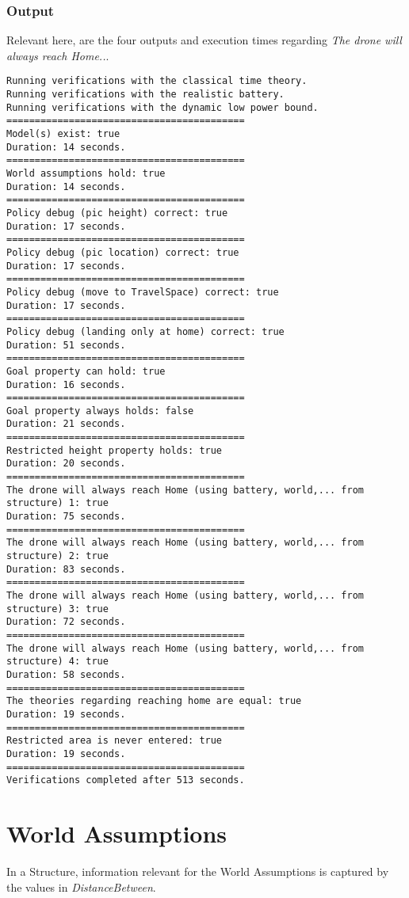 \documentclass[12pt]{extarticle}
\begin{document}
\subsubsection*{Output}
Relevant here, are the four outputs and execution times regarding \textit{The drone will always reach Home..}.
\begin{lstlisting}[basicstyle=\tiny]
Running verifications with the classical time theory.
Running verifications with the realistic battery.
Running verifications with the dynamic low power bound.
==========================================
Model(s) exist: true
Duration: 14 seconds.
==========================================
World assumptions hold: true
Duration: 14 seconds.
==========================================
Policy debug (pic height) correct: true
Duration: 17 seconds.
==========================================
Policy debug (pic location) correct: true
Duration: 17 seconds.
==========================================
Policy debug (move to TravelSpace) correct: true
Duration: 17 seconds.
==========================================
Policy debug (landing only at home) correct: true
Duration: 51 seconds.
==========================================
Goal property can hold: true
Duration: 16 seconds.
==========================================
Goal property always holds: false
Duration: 21 seconds.
==========================================
Restricted height property holds: true
Duration: 20 seconds.
==========================================
The drone will always reach Home (using battery, world,... from structure) 1: true
Duration: 75 seconds.
==========================================
The drone will always reach Home (using battery, world,... from structure) 2: true
Duration: 83 seconds.
==========================================
The drone will always reach Home (using battery, world,... from structure) 3: true
Duration: 72 seconds.
==========================================
The drone will always reach Home (using battery, world,... from structure) 4: true
Duration: 58 seconds.
==========================================
The theories regarding reaching home are equal: true
Duration: 19 seconds.
==========================================
Restricted area is never entered: true
Duration: 19 seconds.
==========================================
Verifications completed after 513 seconds.
\end{lstlisting}

\section{World Assumptions}
In a Structure, information relevant for the World Assumptions is captured by the values in \textit{DistanceBetween}.
\end{document}
